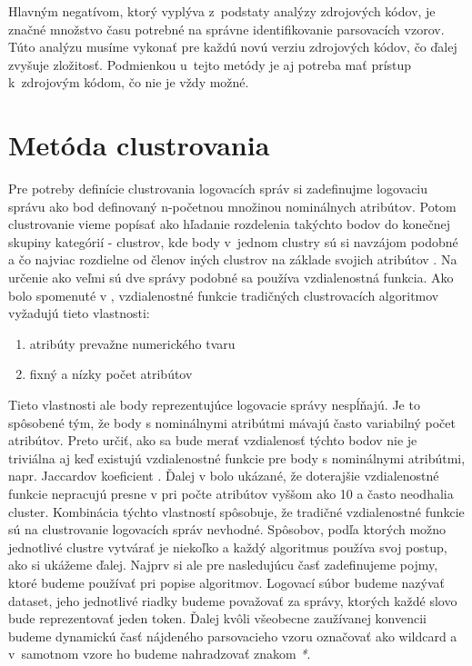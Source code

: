 Hlavným negatívom, ktorý vyplýva z~podstaty analýzy zdrojových kódov, je značné množstvo času potrebné na správne identifikovanie parsovacích vzorov. Túto analýzu musíme vykonať pre každú novú verziu zdrojových kódov, čo ďalej zvyšuje zložitosť. Podmienkou u~tejto metódy je aj potreba mať prístup k~zdrojovým kódom, čo nie je vždy možné. 

\section{ Metóda clustrovania}
Pre potreby definície clustrovania logovacích správ si zadefinujme logovaciu správu ako bod definovaný n-početnou množinou nominálnych atribútov. Potom clustrovanie vieme popísať ako hľadanie rozdelenia takýchto bodov do konečnej skupiny kategórií - clustrov, kde body v~jednom clustry sú si navzájom podobné a čo najviac rozdielne od členov iných clustrov na základe svojich atribútov \parencite{iplom}. Na určenie ako veľmi sú dve správy podobné sa používa vzdialenostná funkcia. Ako bolo spomenuté v \parencite{logcluster}, vzdialenostné funkcie tradičných clustrovacích algoritmov vyžadujú tieto vlastnosti:

\begin{enumerate}
  \item atribúty prevažne numerického tvaru
  \item fixný a nízky počet atribútov
\end{enumerate}

Tieto vlastnosti ale body reprezentujúce logovacie správy nespĺňajú. Je to spôsobené tým, že body s nominálnymi atribútmi mávajú často variabilný počet atribútov. Preto určiť, ako sa bude merať vzdialenosť týchto bodov nie je triviálna aj keď existujú vzdialenostné funkcie pre body s nominálnymi atribútmi, napr. Jaccardov koeficient \parencite{slct}. Ďalej v \parencite{logcluster} bolo ukázané, že doterajšie vzdialenostné funkcie nepracujú presne v pri počte atribútov vyššom ako 10 a často neodhalia cluster. Kombinácia týchto vlastností spôsobuje, že tradičné vzdialenostné funkcie sú na clustrovanie logovacích správ nevhodné. Spôsobov, podľa ktorých možno jednotlivé clustre vytvárať je niekoľko a každý algoritmus používa svoj postup, ako si ukážeme ďalej. Najprv si ale pre nasledujúcu časť zadefinujeme pojmy, ktoré budeme používať pri popise algoritmov. Logovací súbor budeme nazývať dataset, jeho jednotlivé riadky budeme považovať za správy, ktorých každé slovo bude reprezentovať jeden token. Ďalej kvôli všeobecne zaužívanej konvencii budeme dynamickú časť nájdeného parsovacieho vzoru označovať ako wildcard a v~samotnom vzore ho budeme nahradzovať znakom \emph{*}.

